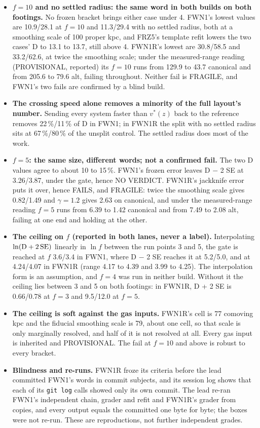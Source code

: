\documentclass[10pt]{article}
\begin{document}
\begin{itemize}
\item \textbf{$f=10$ and no settled radius: the same word in both builds on both footings.} No frozen bracket brings either case under 4. FWN1's lowest values are 10.9/28.1 at $f=10$ and 11.3/29.4 with no settled radius, both at a smoothing scale of 100 proper kpc, and FRZ5's template refit lowers the two cases' D to 13.1 to 13.7, still above 4. FWN1R's lowest are 30.8/58.5 and 33.2/62.6, at twice the smoothing scale; under the measured-range reading (PROVISIONAL, reported) its $f=10$ runs from 129.9 to 43.7 canonical and from 205.6 to 79.6 alt, failing throughout. Neither fail is FRAGILE, and FWN1's two fails are confirmed by a blind build.
\item \textbf{The crossing speed alone removes a minority of the full layout's number.} Sending every system faster than $v^*(z)$ back to the reference removes 22\,\%/11\,\% of D in FWN1; in FWN1R the split with no settled radius sits at 67\,\%/80\,\% of the unsplit control. The settled radius does most of the work.
\item \textbf{$f=5$: the same size, different words; not a confirmed fail.} The two D values agree to about 10 to 15\,\%. FWN1's frozen error leaves D $-$ 2 SE at 3.26/3.87, under the gate, hence NO VERDICT. FWN1R's jackknife error puts it over, hence FAILS, and FRAGILE: twice the smoothing scale gives 0.82/1.49 and $\gamma=1.2$ gives 2.63 on canonical, and under the measured-range reading $f=5$ runs from 6.39 to 1.42 canonical and from 7.49 to 2.08 alt, failing at one end and holding at the other.
\item \textbf{The ceiling on $f$ (reported in both lanes, never a label).} Interpolating $\ln({\rm D}+2\,{\rm SE})$ linearly in $\ln f$ between the run points 3 and 5, the gate is reached at $f$ 3.6/3.4 in FWN1, where D $-$ 2 SE reaches it at 5.2/5.0, and at 4.24/4.07 in FWN1R (range 4.17 to 4.39 and 3.99 to 4.25). The interpolation form is an assumption, and $f=4$ was run in neither build. Without it the ceiling lies between 3 and 5 on both footings: in FWN1R, D + 2 SE is 0.66/0.78 at $f=3$ and 9.5/12.0 at $f=5$.
\item \textbf{The ceiling is soft against the gas inputs.} FWN1R's cell is 77 comoving kpc and the fiducial smoothing scale is 79, about one cell, so that scale is only marginally resolved, and half of it is not resolved at all. Every gas input is inherited and PROVISIONAL. The fail at $f=10$ and above is robust to every bracket.
\item \textbf{Blindness and re-runs.} FWN1R froze its criteria before the lead committed FWN1's words in commit subjects, and its session log shows that each of its \texttt{git log} calls showed only its own commit. The lead re-ran FWN1's independent chain, grader and refit and FWN1R's grader from copies, and every output equals the committed one byte for byte; the boxes were not re-run. These are reproductions, not further independent grades.
\end{itemize}
\end{document}
